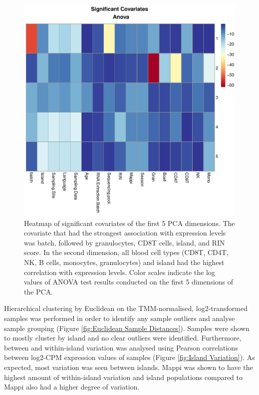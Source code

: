 \documentclass[12pt,a4paper,titlepage,twoside,openright]{book}
\begin{document}
\begin{mainmatter}
{{\begin{figure}[htb!]
\centering
\includegraphics[width=\textwidth,height=\textheight,keepaspectratio]{Figures/significantCovariates_AnovaHeatmap.pdf}
\caption{Heatmap of significant covariates of the first 5 PCA dimensions. The covariate that had the strongest association with expression levels was batch, followed by granulocytes, CD8T cells, island, and RIN score. In the second dimension, all blood cell types (CD8T, CD4T, NK, B cells, monocytes, granulocytes) and island had the highest correlation with expression levels. Color scales indicate the log values of ANOVA test results conducted on the first 5 dimensions of the PCA.}
\label{fig:Significant Covariates}
\end{figure}

Hierarchical clustering by Euclidean on the TMM-normalised, log2-transformed samples was performed in order to identify any sample outliers and analyse sample grouping (﻿Figure \ref{fig:Euclidean Sample Distances}﻿). Samples were shown to mostly cluster by island and no clear outliers were identified. Furthermore, between and within-island variation was analysed using Pearson correlations between log2-CPM expression values of samples (﻿Figure \ref{fig:Island Variation}). As expected, most variation was seen between islands. Mappi was shown to have the highest amount of within-island variation and island populations compared to Mappi also had a higher degree of variation. 

}}
\end{mainmatter}
\end{document}
